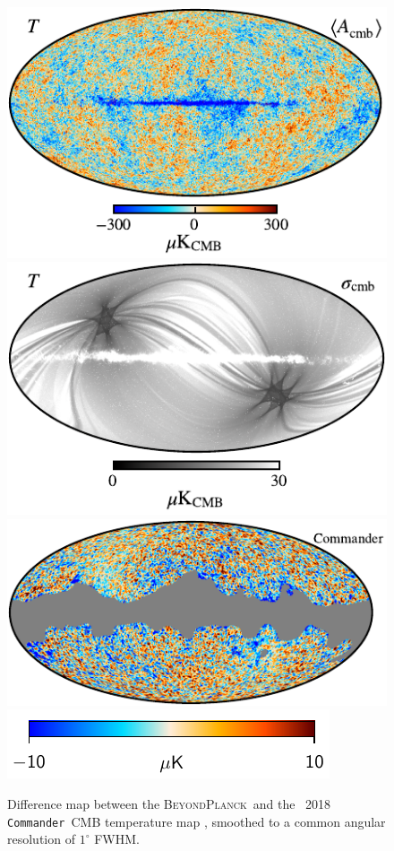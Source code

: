 \documentclass[twocolumn]{aa}
\def\commander{\texttt{Commander}}
\newcommand{\BP}{\textsc{BeyondPlanck}}
\begin{document}
\begin{figure}[t]
  \center
  \includegraphics[width=\linewidth]{figs/BP_cmb_v2_I_MEAN_w8_n1024_cb_nodip_c-planck.pdf}\\
  \includegraphics[width=\linewidth]{figs/BP_cmb_v2_I_STDDEV_w8_n1024_cb_c-neutral.pdf}\\  
  \includegraphics[width=\linewidth]{figs/BP_cmb_diff_commander_v2_I_DIFF_w8_n1024_masked_nodip_c-planck.pdf}
  \includegraphics[width=0.68\linewidth]{figs/colourbar_10uK.pdf}
  \caption{Difference map between the \BP\ and the \Planck\ 2018
    \commander\ CMB temperature map \citep{planck2016-l04}, smoothed
    to a common angular resolution of $1^{\circ}$
    FWHM.}\label{fig:cmb_diff}
\end{figure}
\end{document}
